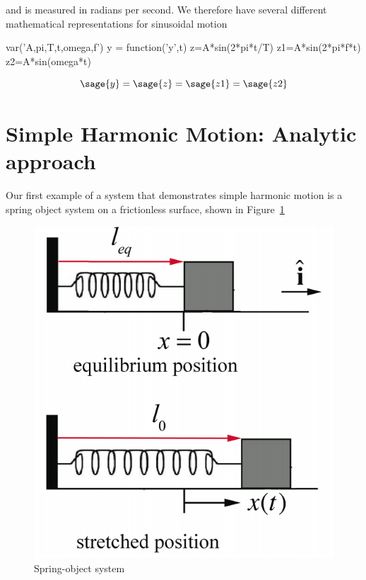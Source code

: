 and is measured in radians per second. We therefore have several different 
mathematical representations for sinusoidal motion

\begin{sagesilent}
var('A,pi,T,t,omega,f')
y = function('y',t)
z=A*sin(2*pi*t/T)
z1=A*sin(2*pi*f*t)
z2=A*sin(omega*t)
\end{sagesilent}

\begin{equation}
\sage{y} = \sage{z} = \sage{z1} = \sage{z2}
\end{equation}

\section{Simple Harmonic Motion: Analytic approach}
Our first example of a system that demonstrates simple harmonic motion is a 
spring object system on a frictionless surface, shown in
Figure~\ref{fig:Spring-object system}


\begin{figure}[h!]
        \begin{center}
        \includegraphics[scale=0.25]{diagram.png}
\end{center}
\caption{Spring-object system}
\label{fig:Spring-object system}
\end{figure}

